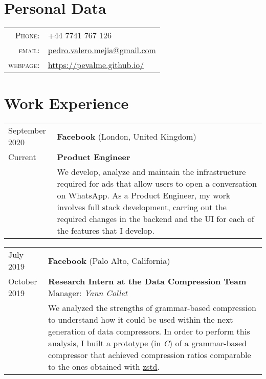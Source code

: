 \documentclass[a4paper,10pt]{article} %
\begin{document}
\pagestyle{empty} %




\par{\bigskip\par} %

\section{Personal Data}

\begin{tabular}{rl}
\textsc{Phone:} & +44 7741 767 126\\
\textsc{email:} & \href{mailto:pedro.valero.mejia@gmail.com}{pedro.valero.mejia@gmail.com} \\
\textsc{webpage:} & \href{https://pevalme.github.io/}{https://pevalme.github.io/}\\
\end{tabular}

\section{Work Experience}

\begin{tabular}{p{2.5cm}p{13.2cm}}
{\small September 2020} & \textbf{Facebook} (London, United Kingdom) \\
{\small Current} & \textcolor{azureblue}{\textbf{Product Engineer}} \hfill  \\
& We develop, analyze and maintain the infrastructure required for ads that allow users to open a conversation on WhatsApp.
As a Product Engineer, my work involves full stack development, carring out the required changes in the backend and the UI for each of the features that I develop.
\end{tabular}

\begin{tabular}{p{2.5cm}p{13.2cm}}
{\small July 2019} & \textbf{Facebook} (Palo Alto, California) \\
{\small October 2019} & \textcolor{azureblue}{\textbf{Research Intern at the Data Compression Team}} \hfill Manager: \emph{Yann Collet} \\
& We analyzed the strengths of grammar-based compression to understand how it could be used within the next generation of data compressors.
In order to perform this analysis, I built a prototype (in \emph{C}) of a grammar-based compressor that achieved compression ratios comparable to the ones obtained with \href{https://facebook.github.io/zstd/}{zstd}.
\end{tabular}
\end{document}
